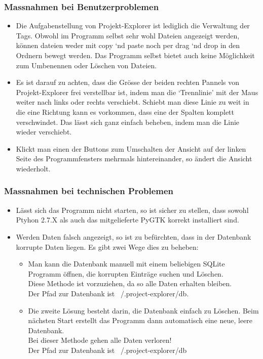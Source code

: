 \documentclass[10pt,paper=a4,final]{scrartcl}
\begin{document}
\subsubsection{Massnahmen bei Benutzerproblemen}
\begin{itemize}
  \item Die Aufgabenstellung von Projekt-Explorer ist lediglich die Verwaltung der Tags. Obwohl im Programm selbst sehr wohl Dateien angezeigt werden, k\"onnen dateien weder mit copy ‘nd paste noch per drag ‘nd drop in den Ordnern bewegt werden. Das Programm selbst bietet auch keine M\"oglichkeit zum Umbenennen oder L\"oschen von Dateien.
  \item Es ist darauf zu achten, dass die Gr\"osse der beiden rechten Pannels von Projekt-Explorer frei verstellbar ist, indem man die ‘Trennlinie’ mit der Maus weiter nach links oder rechts verschiebt. Schiebt man diese Linie zu weit in die eine Richtung kann es vorkommen, dass eine der Spalten komplett verschwindet. Das l\"asst sich ganz einfach beheben, indem man die Linie wieder verschiebt.
  \item Klickt man einen der Buttons zum Umschalten der Ansicht auf der linken Seite des Programmfensters mehrmals hintereinander, so \"andert die Ansicht wiederholt.
\end{itemize}
\subsubsection{Massnahmen bei technischen Problemen}
\begin{itemize}
\item L\"asst sich das Programm nicht starten, so ist sicher zu stellen, dass sowohl Ptyhon 2.7.X als auch das mitgelieferte PyGTK korrekt installiert sind.
\item Werden Daten falsch angezeigt, so ist zu bef\"urchten, dass in der Datenbank korrupte Daten liegen. Es gibt zwei Wege dies zu beheben:
\begin{itemize}
\item Man kann die Datenbank manuell mit einem beliebigen SQLite Programm \"offnen, die korrupten Eintr\"age suchen und L\"oschen.\\ Diese Methode ist vorzuziehen, da so alle Daten erhalten bleiben.\\ Der Pfad zur Datenbank ist ~/.project-explorer/db.
\item Die zweite L\"osung besteht darin, die Datenbank einfach zu L\"oschen. Beim n\"achsten Start erstellt das Programm dann automatisch eine neue, leere Datenbank.\\ Bei dieser Methode gehen alle Daten verloren!\\ Der Pfad zur Datenbank ist ~/.project-explorer/db
\end{itemize}
\end{itemize}
\end{document}
